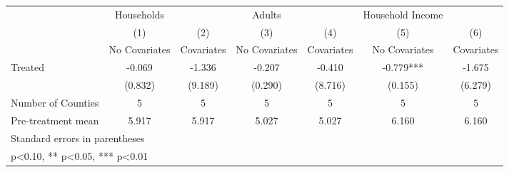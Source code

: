 {
\def\sym#1{\ifmmode^{#1}\else\(^{#1}\)\fi}
\begin{tabular}{l*{6}{c}}
\hline\hline
            &  Households   &               &      Adults   &               &Household Income   &               \\
            &\multicolumn{1}{c}{(1)}&\multicolumn{1}{c}{(2)}&\multicolumn{1}{c}{(3)}&\multicolumn{1}{c}{(4)}&\multicolumn{1}{c}{(5)}&\multicolumn{1}{c}{(6)}\\
            &\multicolumn{1}{c}{No Covariates}&\multicolumn{1}{c}{Covariates}&\multicolumn{1}{c}{No Covariates}&\multicolumn{1}{c}{Covariates}&\multicolumn{1}{c}{No Covariates}&\multicolumn{1}{c}{Covariates}\\
\hline
Treated     &      -0.069   &      -1.336   &      -0.207   &      -0.410   &      -0.779***&      -1.675   \\
            &     (0.832)   &     (9.189)   &     (0.290)   &     (8.716)   &     (0.155)   &     (6.279)   \\
\hline
Number of Counties&           5   &           5   &           5   &           5   &           5   &           5   \\
Pre-treatment mean&       5.917   &       5.917   &       5.027   &       5.027   &       6.160   &       6.160   \\
\hline\hline
\multicolumn{7}{l}{\footnotesize Standard errors in parentheses}\\
\multicolumn{7}{l}{\footnotesize * p<0.10, ** p<0.05, *** p<0.01}\\
\end{tabular}
}
